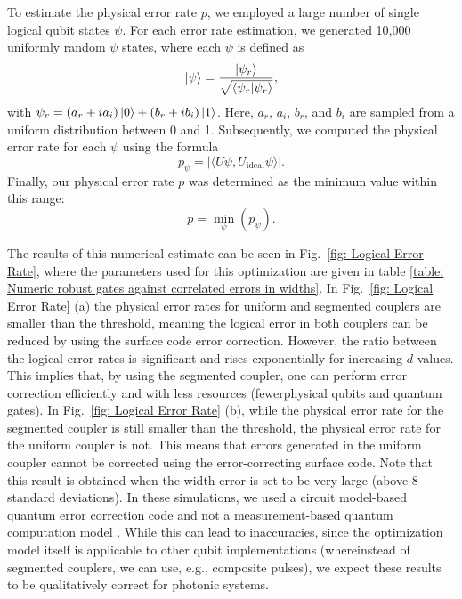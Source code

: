 \documentclass[floatfix,reprint, amsmath,amssymb,aps,superscriptaddress,nofootinbib]{revtex4-2}
\begin{document}
To estimate the physical error rate $p$, we employed a large number of single logical qubit states $\psi$. For each error rate estimation, we generated 10,000 uniformly random $\psi$ states, where each $\psi$ is defined as
\begin{equation}
    \ket{\psi} = \frac{\ket{\psi_r}}{\sqrt{\braket{\psi_r|\psi_r}}},
\end{equation}
with $\psi_r = (a_r + i a_i)\ket{0} + (b_r + i b_i)\ket{1}$. Here, $a_r$, $a_i$, $b_r$, and $b_i$ are sampled from a uniform distribution between 0 and 1.
Subsequently, we computed the physical error rate for each $\psi$ using the formula
\begin{equation}
    p_{\psi} = \left| \langle U \psi, U_{\mathrm{ideal}} \psi \rangle \right|.
\end{equation}
Finally, our physical error rate $p$ was determined as the minimum value within this range:
\begin{equation}
    p = \min_{\psi} (p_{\psi}).
\end{equation}

The results of this numerical estimate can be seen in Fig.~\ref{fig: Logical Error Rate}, where the parameters used for this optimization are given in table \ref{table: Numeric robust gates against correlated errors in widths}. 
In Fig.~\ref{fig: Logical Error Rate} (a) the physical error rates for uniform and segmented couplers are smaller than the threshold, meaning the logical error in both couplers can be reduced by using the surface code error correction. However, the ratio between the logical error rates is significant and rises exponentially for increasing $d$ values. This implies that, by using the segmented coupler, one can perform error correction efficiently and with less resources (fewerphysical qubits and quantum gates).
In Fig.~\ref{fig: Logical Error Rate} (b), while the physical error rate for the segmented coupler is still smaller than the threshold, the physical error rate for the uniform coupler is not. This means that errors generated in the uniform coupler cannot be corrected using the 
error-correcting surface code. Note that this result is obtained when the width error is set to be very large (above 8 standard deviations). 
In these simulations, we used a circuit model-based quantum error correction code and not a measurement-based quantum computation model \cite{Raussendorf2003}. While this can lead to inaccuracies, since the optimization model itself is applicable to other qubit implementations (whereinstead of segmented couplers, we can use, e.g., composite pulses), we expect these results to be qualitatively correct for photonic systems.
\end{document}
